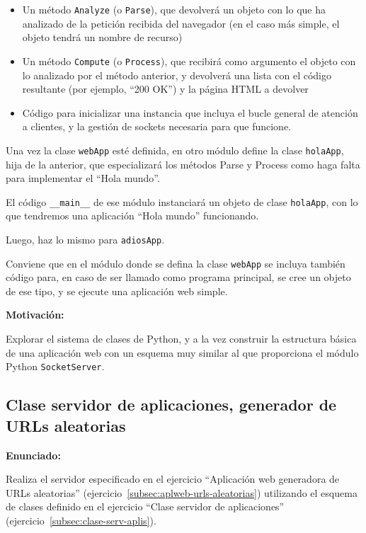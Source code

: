 \begin{itemize}
\item Un método \texttt{Analyze} (o \texttt{Parse}), que devolverá un objeto con lo que ha analizado de la petición recibida del navegador (en el caso más simple, el objeto tendrá un nombre de recurso)
\item Un método \texttt{Compute} (o \texttt{Process}), que recibirá como argumento el objeto con lo analizado por el método anterior, y devolverá una lista con el código resultante (por ejemplo, ``200 OK'') y la página HTML a devolver
\item Código para inicializar una instancia que incluya el bucle general de atención a clientes, y la gestión de sockets necesaria para que funcione.
\end{itemize}

Una vez la clase \texttt{webApp} esté definida, en otro módulo define la clase \texttt{holaApp}, hija de la anterior, que especializará los métodos Parse y Process como haga falta para implementar el ``Hola mundo''.

El código \verb|__main__| de ese módulo instanciará un objeto de clase \texttt{holaApp}, con lo que tendremos una aplicación ``Hola mundo'' funcionando.

Luego, haz lo mismo para \texttt{adiosApp}.

Conviene que en el módulo donde se defina la clase \texttt{webApp} se incluya también código para, en caso de ser llamado como programa principal, se cree un objeto de ese tipo, y se ejecute una aplicación web simple.

\textbf{Motivación:}

Explorar el sistema de clases de Python, y a la vez construir la estructura básica de una aplicación web con un esquema muy similar al que proporciona el módulo Python \texttt{SocketServer}.

\subsection{Clase servidor de aplicaciones, generador de URLs aleatorias}
\label{subsec:aplweb-clase-urls-aleatorias}

\textbf{Enunciado:}

Realiza el servidor especificado en el ejercicio ``Aplicación web generadora de URLs aleatorias'' (ejercicio~\ref{subsec:aplweb-urls-aleatorias}) utilizando el esquema de clases definido en el ejercicio ``Clase servidor de aplicaciones'' (ejercicio~\ref{subsec:clase-serv-aplis}).

